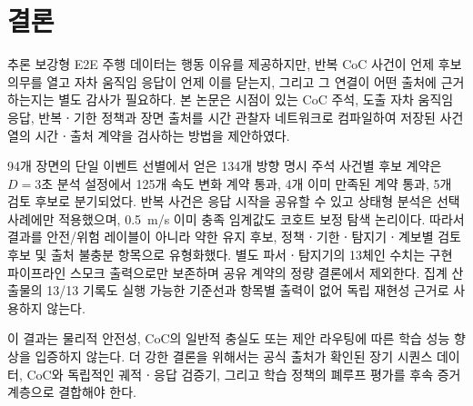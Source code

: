 \section{결론}
\label{sec:conclusion}

추론 보강형 E2E 주행 데이터는 행동 이유를 제공하지만, 반복 CoC 사건이 언제 후보 의무를 열고 자차 움직임 응답이 언제 이를 닫는지, 그리고 그 연결이 어떤 출처에 근거하는지는 별도 감사가 필요하다. 본 논문은 시점이 있는 CoC 주석, 도출 자차 움직임 응답, 반복ㆍ기한 정책과 장면 출처를 \uppaal 시간 관찰자 네트워크로 컴파일하여 저장된 사건열의 시간ㆍ출처 계약을 검사하는 방법을 제안하였다.

94개 장면의 단일 이벤트 선별에서 얻은 134개 방향 명시 주석 사건별 후보 계약은 $D=3$초 분석 설정에서 125개 속도 변화 계약 통과, 4개 이미 만족된 계약 통과, 5개 검토 후보로 분기되었다. 반복 사건은 응답 시작을 공유할 수 있고 상태형 분석은 선택 사례에만 적용했으며, 0.5~m/s 이미 충족 임계값도 코호트 보정 탐색 논리이다. 따라서 결과를 안전/위험 레이블이 아니라 약한 유지 후보, 정책ㆍ기한ㆍ탐지기ㆍ계보별 검토 후보 및 출처 불충분 항목으로 유형화했다. 별도 파서ㆍ탐지기의 13체인 수치는 구현 파이프라인 스모크 출력으로만 보존하며 공유 계약의 정량 결론에서 제외한다. 집계 산출물의 13/13 기록도 실행 가능한 기준선과 항목별 출력이 없어 독립 재현성 근거로 사용하지 않는다.

이 결과는 물리적 안전성, CoC의 일반적 충실도 또는 제안 라우팅에 따른 학습 성능 향상을 입증하지 않는다. 더 강한 결론을 위해서는 공식 출처가 확인된 장기 시퀀스 데이터, CoC와 독립적인 궤적ㆍ응답 검증기, 그리고 학습 정책의 폐루프 평가를 후속 증거 계층으로 결합해야 한다.
